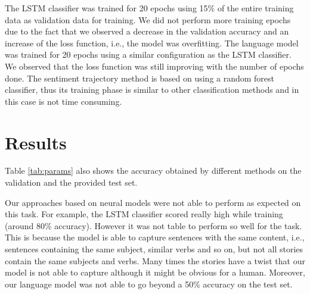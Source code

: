 \documentclass{article}
\newcommand{\lstm}{LSTM }
\begin{document}
The \lstm classifier was trained for 20 epochs using 15\% of the entire training
data as validation data for training. We did not perform more training epochs
due to the fact that we observed a decrease in the validation accuracy and an
increase of the loss function, i.e., the model was overfitting.  The language
model was trained for 20 epochs using a similar configuration as the \lstm
classifier. We observed that the loss function was still improving with the
number of epochs done. The sentiment trajectory method is based on using a
random forest classifier, thus its training phase is similar to other
classification methods and in this case is not time consuming.

\section{Results}
\label{sec:results}

Table \ref{tab:params} also shows the accuracy obtained by different methods on the
validation and the provided test set. 


Our approaches based on neural models were not able to perform as expected on
this task. For example, the \lstm classifier scored really high while training
(around 80\% accuracy). However it was not table to perform so well for the
task. This is because the model is able to capture sentences with the same
content, i.e., sentences containing the same subject, similar verbs and so on,
but not all stories contain the same subjects and verbs. Many times the stories
have a twist that our model is not able to capture although it might be obvious
for a human. Moreover, our language model was not able to go beyond a 50\%
accuracy on the test set. 
\end{document}
